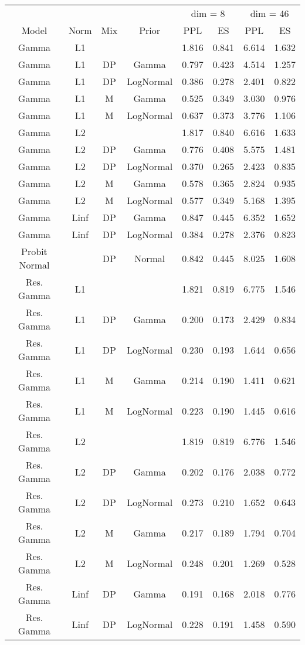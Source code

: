 
\begin{tabular}{cccccccc}
\toprule
\multicolumn{4}{c}{ } & \multicolumn{2}{c}{dim = 8} & \multicolumn{2}{c}{dim = 46} \\
\cmidrule(l{3pt}r{3pt}){5-6} \cmidrule(l{3pt}r{3pt}){7-8}
Model & Norm & Mix & Prior & PPL & ES & PPL & ES\\
\midrule
Gamma & L1 &  &  & 1.816 & 0.841 & 6.614 & 1.632\\
Gamma & L1 & DP & Gamma & 0.797 & 0.423 & 4.514 & 1.257\\
Gamma & L1 & DP & LogNormal & 0.386 & 0.278 & 2.401 & 0.822\\
Gamma & L1 & M & Gamma & 0.525 & 0.349 & 3.030 & 0.976\\
Gamma & L1 & M & LogNormal & 0.637 & 0.373 & 3.776 & 1.106\\
\addlinespace
Gamma & L2 &  &  & 1.817 & 0.840 & 6.616 & 1.633\\
Gamma & L2 & DP & Gamma & 0.776 & 0.408 & 5.575 & 1.481\\
Gamma & L2 & DP & LogNormal & 0.370 & 0.265 & 2.423 & 0.835\\
Gamma & L2 & M & Gamma & 0.578 & 0.365 & 2.824 & 0.935\\
Gamma & L2 & M & LogNormal & 0.577 & 0.349 & 5.168 & 1.395\\
\addlinespace
Gamma & Linf & DP & Gamma & 0.847 & 0.445 & 6.352 & 1.652\\
Gamma & Linf & DP & LogNormal & 0.384 & 0.278 & 2.376 & 0.823\\
Probit Normal &  & DP & Normal & 0.842 & 0.445 & 8.025 & 1.608\\
Res. Gamma & L1 &  &  & 1.821 & 0.819 & 6.775 & 1.546\\
Res. Gamma & L1 & DP & Gamma & 0.200 & 0.173 & 2.429 & 0.834\\
\addlinespace
Res. Gamma & L1 & DP & LogNormal & 0.230 & 0.193 & 1.644 & 0.656\\
Res. Gamma & L1 & M & Gamma & 0.214 & 0.190 & 1.411 & 0.621\\
Res. Gamma & L1 & M & LogNormal & 0.223 & 0.190 & 1.445 & 0.616\\
Res. Gamma & L2 &  &  & 1.819 & 0.819 & 6.776 & 1.546\\
Res. Gamma & L2 & DP & Gamma & 0.202 & 0.176 & 2.038 & 0.772\\
\addlinespace
Res. Gamma & L2 & DP & LogNormal & 0.273 & 0.210 & 1.652 & 0.643\\
Res. Gamma & L2 & M & Gamma & 0.217 & 0.189 & 1.794 & 0.704\\
Res. Gamma & L2 & M & LogNormal & 0.248 & 0.201 & 1.269 & 0.528\\
Res. Gamma & Linf & DP & Gamma & 0.191 & 0.168 & 2.018 & 0.776\\
Res. Gamma & Linf & DP & LogNormal & 0.228 & 0.191 & 1.458 & 0.590\\
\bottomrule
\end{tabular}
